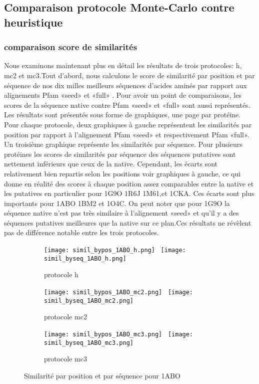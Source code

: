         \subsection{Comparaison protocole Monte-Carlo contre heuristique}
        \subsubsection{comparaison score de similarités}
Nous examinons maintenant plus en détail les résultats de trois protocoles: h, mc2 et mc3.Tout d'abord, nous calculons le score de similarité par position et par séquence de nos dix milles meilleurs  séquences d'acides aminés par rapport aux alignements Pfam «seed» et «full» . Pour avoir un point de comparaisons, les scores  de la séquence native contre Pfam «seed» et «full»  sont aussi représentés. Les résultats sont présentés sous forme de graphiques, une page par protéine. Pour chaque protocole, deux graphiques à gauche  représentent les similarités par position par rapport à l'alignement Pfam «seed» et respectivement Pfam «full». Un troisième graphique représente les similarités par séquence.  Pour plusieurs protéines les scores de similarités par séquence  des séquences putatives sont nettement inférieurs que ceux de la native. Cependant, les écarts sont relativement bien repartis selon les positions voir graphiques à gauche, ce qui donne en réalité des scores à chaque position assez comparables entre la native et les putatives en particulier pour   1G9O  1R6J 1M61,et 1CKA. Ces écarts sont plus importants pour 1ABO 1BM2 et 1O4C. On peut noter que pour 1G9O la séquence native n'est pas très similaire à l'alignement «seed» et qu'il y a des séquences putatives meilleures que la native sur ce plan.Ces résultats ne révèlent pas de différence notable entre les trois protocoles.



\captionsetup[subfigure]{font=scriptsize}

   \begin{figure}
   \begin{subfigure}[b]{\linewidth}
     \centering
          \texttt{[image: simil\_bypos\_1ABO\_h.png]}~
          \texttt{[image: simil\_byseq\_1ABO\_h.png]} 
     \caption{protocole h}
   \end{subfigure}

   \begin{subfigure}[b]{\linewidth}
     \centering
          \texttt{[image: simil\_bypos\_1ABO\_mc2.png]}~ 
          \texttt{[image: simil\_byseq\_1ABO\_mc2.png]} 
     \caption{protocole mc2}
   \end{subfigure}

   \begin{subfigure}[b]{\linewidth}
     \centering
          \texttt{[image: simil\_bypos\_1ABO\_mc3.png]}~  
          \texttt{[image: simil\_byseq\_1ABO\_mc3.png]} 
     \caption{protocole mc3}
   \end{subfigure}

     \caption{Similarité par position et par séquence pour 1ABO}
\label{grah:simil_1ABO}
   \end{figure}

